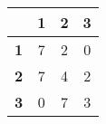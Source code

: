 \begin{tabular}{l|ccc}
\toprule
&\textbf{1} & \textbf{2} & \textbf{3}\\
\midrule
\textbf{1} & 7 & 2 & 0\\
\textbf{2} & 7 & 4 & 2\\
\textbf{3} & 0 & 7 & 3\\
\bottomrule
\end{tabular}
